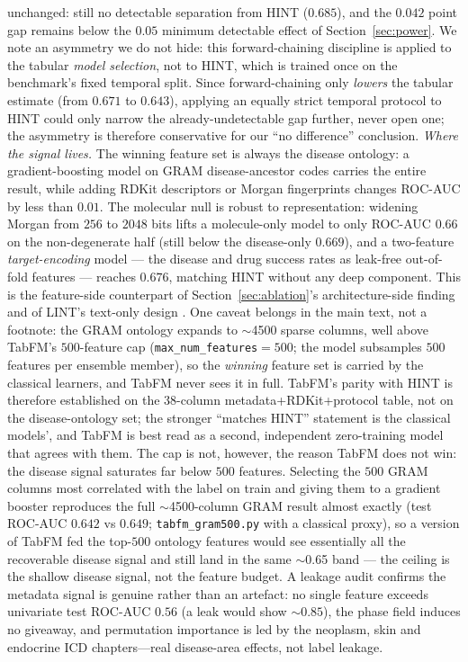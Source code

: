 \documentclass[a4paper,fleqn]{cas-sc}
\begin{document}
unchanged: still no detectable separation from HINT ($0.685$), and the $0.042$ point gap remains
below the $0.05$ minimum detectable effect of Section~\ref{sec:power}. We note an asymmetry we do
not hide: this forward-chaining discipline is applied to the tabular \emph{model selection}, not to
HINT, which is trained once on the benchmark's fixed temporal split. Since forward-chaining only
\emph{lowers} the tabular estimate (from $0.671$ to $0.643$), applying an equally strict temporal
protocol to HINT could only narrow the already-undetectable gap further, never open one; the
asymmetry is therefore conservative for our ``no difference'' conclusion.
\emph{Where the signal lives.} The winning feature set is always the disease ontology: a
gradient-boosting model on GRAM disease-ancestor codes carries the entire result, while
adding RDKit descriptors or Morgan fingerprints changes ROC-AUC by less than $0.01$. The molecular
null is robust to representation: widening Morgan from $256$ to $2048$ bits lifts a molecule-only
model to only ROC-AUC $0.66$ on the non-degenerate half (still below the disease-only $0.669$), and
a two-feature \emph{target-encoding} model --- the disease and drug success rates as leak-free
out-of-fold features --- reaches $0.676$, matching HINT without any deep component. This is
the feature-side counterpart of Section~\ref{sec:ablation}'s architecture-side finding and of
LINT's text-only design \citep{gao2024lint}. One caveat belongs in the main text, not a
footnote: the GRAM ontology expands to $\sim$4500 sparse columns, well above TabFM's
$500$-feature cap (\texttt{max\_num\_features}$=500$; the model subsamples $500$ features per
ensemble member), so the \emph{winning} feature set is carried by the classical learners, and
TabFM never sees it in full. TabFM's parity with HINT is therefore established on the
$38$-column metadata+RDKit+protocol table, not on the disease-ontology set; the stronger
``matches HINT'' statement is the classical models', and TabFM is best read as a second,
independent zero-training model that agrees with them. The cap is not, however, the reason
TabFM does not win: the disease signal saturates far below $500$ features. Selecting the
$500$ GRAM columns most correlated with the label on train and giving them to a gradient
booster reproduces the full $\sim$4500-column GRAM result almost exactly (test ROC-AUC $0.642$
vs $0.649$; \texttt{tabfm\_gram500.py} with a classical proxy), so a version of TabFM fed the
top-$500$ ontology features would see essentially all the recoverable disease signal and still
land in the same $\sim$0.65 band --- the ceiling is the shallow disease signal, not the feature
budget. A leakage audit confirms the metadata signal is
genuine rather than an artefact: no single feature exceeds univariate test ROC-AUC $0.56$ (a
leak would show $\sim0.85$), the phase field induces no giveaway, and permutation importance
is led by the neoplasm, skin and endocrine ICD chapters---real disease-area effects, not
label leakage.
\end{document}
